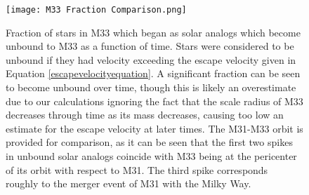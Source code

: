 \documentclass{aastex63}
\begin{document}
\begin{figure}
    \centering
    \texttt{[image: M33 Fraction Comparison.png]}
    \caption{Fraction of stars in M33 which began as solar analogs which become unbound to M33 as a function of time. Stars were considered to be unbound if they had velocity exceeding the escape velocity given in Equation \ref{escapevelocityequation}. A significant fraction can be seen to become unbound over time, though this is likely an overestimate due to our calculations ignoring the fact that the scale radius of M33 decreases through time as its mass decreases, causing too low an estimate for the escape velocity at later times. The M31-M33 orbit is provided for comparison, as it can be seen that the first two spikes in unbound solar analogs coincide with M33 being at the pericenter of its orbit with respect to M31. The third spike corresponds roughly to the merger event of M31 with the Milky Way.}
    \label{m33fractiongraph}
\end{figure}
\end{document}
